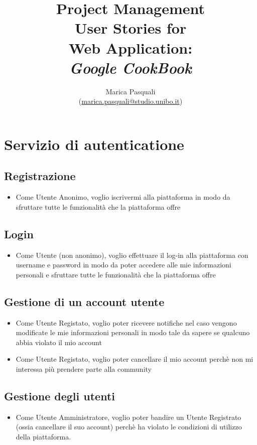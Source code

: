 \documentclass{article}
\title{
    Project Management \\
    \textbf{ 
        User Stories for\\ 
        Web Application: \\
        \textit{Google CookBook}
    }
}
\author{
    Marica Pasquali \\ 
    (\href{mailto:marica.pasquali@studio.unibo.it}{marica.pasquali@studio.unibo.it})
}
\begin{document}
\maketitle
\newpage
\tableofcontents
\newpage

\section{Servizio di autenticatione}
\subsection{Registrazione}
\begin{itemize}
    \item Come Utente Anonimo, voglio iscrivermi alla piattaforma in modo da sfruttare tutte le funzionalità 
    che la piattaforma offre
\end{itemize}

\subsection{Login}
\begin{itemize}
    \item Come Utente (non anonimo), voglio effettuare il log-in alla piattaforma con username e password 
    in modo da poter accedere alle mie informazioni personali e sfruttare tutte le funzionalità che 
    la piattaforma offre
\end{itemize}

\subsection{Gestione di un account utente}
\begin{itemize}
    \item Come Utente Registato, voglio poter ricevere notifiche nel caso vengono modificate le mie 
    informazioni personali in modo tale da sapere se qualcuno abbia violato il mio account
    \item Come Utente Registato, voglio poter cancellare il mio account perchè non mi interessa più 
    prendere parte alla community
\end{itemize}

\subsection{Gestione degli utenti}
\begin{itemize}
    \item Come Utente Amministratore, voglio poter bandire un Utente Registrato (ossia cancellare il suo account)
    perchè ha violato le condizioni di utilizzo della piattaforma.
\end{itemize}
\end{document}

